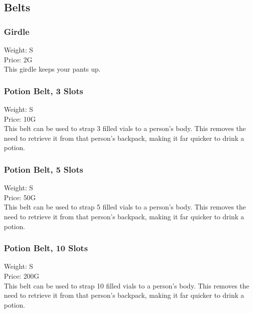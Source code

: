 \subsection{Belts}

\subsubsection{Girdle}
Weight: S\\
Price: 2G\\
This girdle keeps your pants up.

\subsubsection{Potion Belt, 3 Slots}
Weight: S\\
Price: 10G\\
This belt can be used to strap 3 filled vials to a person's body.
This removes the need to retrieve it from that person's backpack, making it far quicker to drink a potion.

\subsubsection{Potion Belt, 5 Slots}
Weight: S\\
Price: 50G\\
This belt can be used to strap 5 filled vials to a person's body.
This removes the need to retrieve it from that person's backpack, making it far quicker to drink a potion.

\subsubsection{Potion Belt, 10 Slots}
Weight: S\\
Price: 200G\\
This belt can be used to strap 10 filled vials to a person's body.
This removes the need to retrieve it from that person's backpack, making it far quicker to drink a potion.



